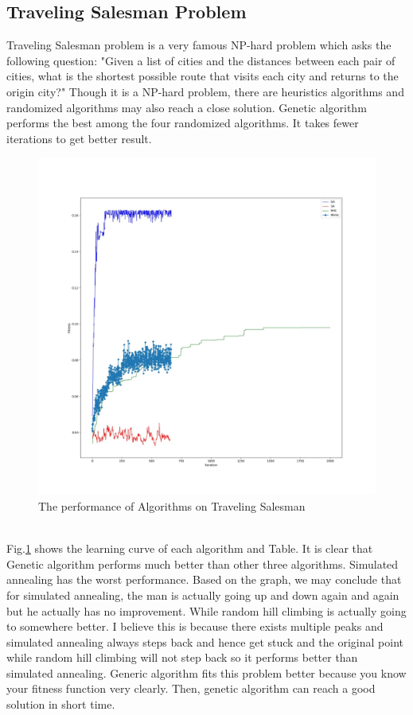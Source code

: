 \documentclass[11pt]{article}
\begin{document}
\subsection{Traveling Salesman Problem}
Traveling Salesman problem is a very famous NP-hard problem which asks the following question: "Given a list of cities and the distances between each pair of cities, what is the shortest possible route that visits each city and returns to the origin city?" Though it is a NP-hard problem, there are heuristics algorithms and randomized algorithms may also reach a close solution. Genetic algorithm performs the best among the four randomized algorithms. It takes fewer iterations to get better result.
\begin{figure}[h!]
  \includegraphics[width=\linewidth]{../plot/ts_plot.jpg}
  \caption{The performance of Algorithms on Traveling Salesman}
  \label{fig:ts}
\end{figure}
\\Fig.\ref{fig:ts} shows the learning curve of each algorithm and Table. It is clear that Genetic algorithm performs much better than other three algorithms. Simulated annealing has the worst performance. Based on the graph, we may conclude that for simulated annealing, the man is actually going up and down again and again but he actually has no improvement. While random hill climbing is actually going to somewhere better. I believe this is because there exists multiple peaks and simulated annealing always steps back and hence get stuck and the original point while random hill climbing will not step back so it performs better than simulated annealing. Generic algorithm fits this problem better because you know your fitness function very clearly. Then, genetic algorithm can reach a good solution in short time.\\
\end{document}
